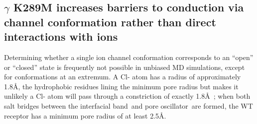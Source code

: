 \documentclass[journal=jacsat,manuscript=article]{achemso}
\newcommand{\fivering}{interfacial band~}
\newcommand{\fiveringnos}{interfacial band}
\newcommand{\triad}{pore oscillator~}
\newcommand{\triadns}{pore oscillator}
\newcommand{\WT}{WT\xspace}
\newcommand{\MT}{K289M\xspace}
\begin{document}
 
 
\subsection*{$\gamma$ K289M increases barriers to conduction via channel conformation rather than direct interactions with ions}  
 
Determining whether a single ion channel conformation corresponds to an ``open'' or ``closed'' state is frequently not possible in unbiased MD simulations, except for conformations at an extremum. A Cl- atom has a radius of approximately 1.8\AA, the hydrophobic residues lining the minimum pore radius but makes it unlikely a Cl- atom will pass through a constriction of exactly 1.8\AA\ ; when both salt bridges between the \fivering and \triad are formed, the \WT receptor has a minimum pore radius of at least 2.5\AA.
\end{document}
